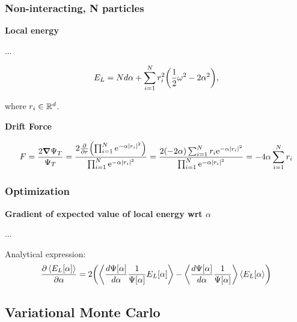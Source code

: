 \subsubsection*{Non-interacting,  N particles}

\textbf{Local energy}

... 

\begin{equation*}
    E_L = N d \alpha + \sum_{i=1}^N r_i^2 \qty(\frac{1}{2} \omega^2 - 2 \alpha^2),
\end{equation*}

where $r_i \in \mathbb{R}^d$.

\textbf{Drift Force}

\begin{equation*}
    F = \frac{2 \grad \Psi_T}{\Psi_T} = \frac{2 \pdv{r} \qty( \prod_{i=1}^N \mathrm{e}^{-\alpha \abs{r_i}^2})}{\prod_{i=1}^N \mathrm{e}^{-\alpha \abs{r_i}^2}} = \frac{2 (-2 \alpha) \sum_{i=1}^N r_i \mathrm{e}^{-\alpha \abs{r_i}^2}}{\prod_{i=1}^N \mathrm{e}^{-\alpha \abs{r_i}^2}} = - 4 \alpha \sum_{i=1}^N r_i
\end{equation*}


\subsubsection*{Optimization}

\textbf{Gradient of expected value of local energy wrt $\alpha$}

...

Analytical expression: 
\begin{equation}\label{eq:grad_expval_E_L}
    \frac{\partial \expval{E_L[\mathbf{\alpha}]}}{\partial\mathbf{\alpha}} = 2\qty(\expval{\frac{d\Psi[\mathbf{\alpha}]}{d\mathbf{\alpha}}\frac{1}{\Psi[\mathbf{\alpha}]}E_L[\mathbf{\alpha}]} - \expval{\frac{d\Psi[\mathbf{\alpha}]}{d\mathbf{\alpha}}\frac{1}{\Psi[\mathbf{\alpha}]}}\expval{E_L[\mathbf{\alpha}})
\end{equation}


\subsection*{Variational Monte Carlo}

